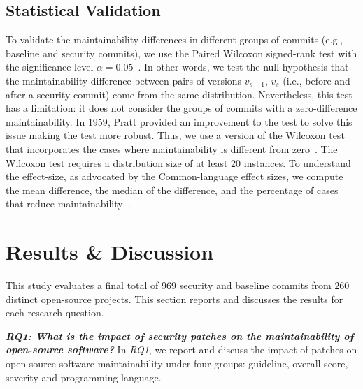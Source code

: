 \documentclass[smallextended]{svjour3}       %
\begin{document}
\subsection{Statistical Validation}\label{sec:statsval}
%
To validate the maintainability differences in different groups of 
commits (e.g., baseline and security commits), we use the Paired 
Wilcoxon signed-rank test with the significance level $\alpha = 
0.05$~\cite{10.2307/3001968}. In other words, we test the null 
hypothesis that the maintainability difference between pairs of 
versions $v_{s-1}$, $v_s$ (i.e., before and after a security-commit) 
come from the same distribution. Nevertheless, this test 
has a limitation: it does not consider the groups of commits with a 
zero-difference maintainability. In $1959$, Pratt provided an 
improvement to the test to solve this issue making the test more 
robust. Thus, we use a version of the Wilcoxon test that 
incorporates the cases where maintainability is different from 
zero~\cite{10.2307/2282543}. The Wilcoxon test requires a 
distribution size of at least $20$ instances. To understand the 
effect-size, as advocated by the Common-language effect 
sizes, we compute the mean difference, the median of 
the difference, and the percentage of cases that reduce maintainability~\cite{graw:1992}.
%

\section{Results \& Discussion}\label{sec:results}

This study evaluates a final total of $969$ security and baseline 
commits from $260$ distinct open-source projects. This section 
reports and discusses the results for each research question.
%

\textit{\textbf{RQ1: What is the impact of security patches on the
maintainability of open-source software?}} In \emph{RQ1}, we 
report and discuss the impact of patches on open-source software 
maintainability under four groups: guideline, overall score, 
severity and programming language.
\end{document}

